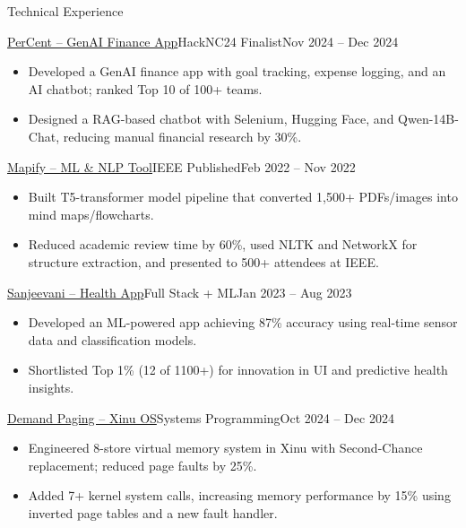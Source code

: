 \documentclass[]{mcdowellcv}
\begin{document}
\begin{cvsection}{Technical Experience}
  \begin{cvsubsection}{\href{https://github.com/adityapai18/HackNC24}{PerCent – GenAI Finance App}}{HackNC24 Finalist}{Nov 2024 -- Dec 2024}
    \begin{itemize}
      \item Developed a GenAI finance app with goal tracking, expense logging, and an AI chatbot; ranked Top 10 of 100+ teams.
      \item Designed a RAG-based chatbot with Selenium, Hugging Face, and Qwen-14B-Chat, reducing manual financial research by 30\%.
    \end{itemize}
    \vspace{-1.5pt}
  \end{cvsubsection}

  \begin{cvsubsection}{\href{https://github.com/Aditya-k24/mapify}{Mapify – ML \& NLP Tool}}{IEEE Published}{Feb 2022 -- Nov 2022}
    \begin{itemize}
      \item Built T5-transformer model pipeline that converted 1,500+ PDFs/images into mind maps/flowcharts.
      \item Reduced academic review time by 60\%, used NLTK and NetworkX for structure extraction, and presented to 500+ attendees at IEEE.
    \end{itemize}
    \vspace{-1.5pt}
  \end{cvsubsection}

  \begin{cvsubsection}{\href{https://github.com/heet214/Sanjeevani-health}{Sanjeevani – Health App}}{Full Stack + ML}{Jan 2023 -- Aug 2023}
    \begin{itemize}
      \item Developed an ML-powered app achieving 87\% accuracy using real-time sensor data and classification models.
      \item Shortlisted Top 1\% (12 of 1100+) for innovation in UI and predictive health insights.
    \end{itemize}
    \vspace{-1.5pt}
  \end{cvsubsection}

  \begin{cvsubsection}{\href{https://github.com/ncsu-csc-501/project3-mndedhia_akulka26_aapai}{Demand Paging – Xinu OS}}{Systems Programming}{Oct 2024 -- Dec 2024}
    \begin{itemize}
      \item Engineered 8-store virtual memory system in Xinu with Second-Chance replacement; reduced page faults by 25\%.
      \item Added 7+ kernel system calls, increasing memory performance by 15\% using inverted page tables and a new fault handler.
    \end{itemize}
  \end{cvsubsection}
\end{cvsection}
\end{document}
